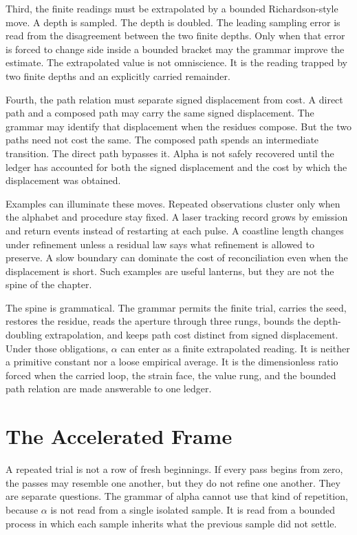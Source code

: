Third, the finite readings must be extrapolated by a bounded Richardson-style
move. A depth is sampled. The depth is doubled. The leading sampling error is
read from the disagreement between the two finite depths. Only when that error
is forced to change side inside a bounded bracket may the grammar improve the
estimate. The extrapolated value is not omniscience. It is the reading trapped
by two finite depths and an explicitly carried remainder.

Fourth, the path relation must separate signed displacement from cost. A
direct path and a composed path may carry the same signed displacement. The
grammar may identify that displacement when the residues compose. But the two
paths need not cost the same. The composed path spends an intermediate
transition. The direct path bypasses it. Alpha is not safely recovered until
the ledger has accounted for both the signed displacement and the cost by
which the displacement was obtained.

Examples can illuminate these moves. Repeated observations cluster only when
the alphabet and procedure stay fixed. A laser tracking record grows by
emission and return events instead of restarting at each pulse. A coastline
length changes under refinement unless a residual law says what refinement is
allowed to preserve. A slow boundary can dominate the cost of reconciliation
even when the displacement is short. Such examples are useful lanterns, but
they are not the spine of the chapter.

The spine is grammatical. The grammar permits the finite trial, carries the
seed, restores the residue, reads the aperture through three rungs, bounds the
depth-doubling extrapolation, and keeps path cost distinct from signed
displacement. Under those obligations, \(\alpha\) can enter as a finite
extrapolated reading. It is neither a primitive constant nor a loose empirical
average. It is the dimensionless ratio forced when the carried loop, the
strain face, the value rung, and the bounded path relation are made answerable
to one ledger.

\section{The Accelerated Frame}

A repeated trial is not a row of fresh beginnings. If every pass begins from
zero, the passes may resemble one another, but they do not refine one another.
They are separate questions. The grammar of alpha cannot use that kind of
repetition, because \(\alpha\) is not read from a single isolated sample. It
is read from a bounded process in which each sample inherits what the previous
sample did not settle.

